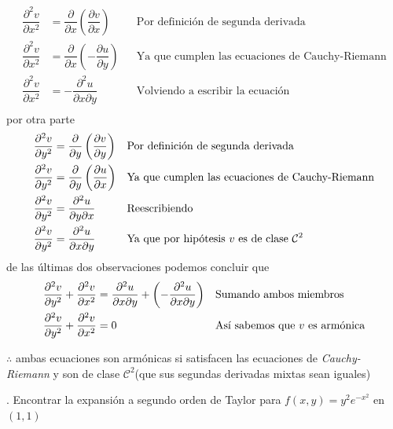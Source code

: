 \documentclass[letterpaper]{article}
\renewcommand{\d}{\partial}
\renewcommand{\*}{\cdot}
\theoremstyle{definition}
\begin{document}
\begin{align*}
\dfrac{\d^2v}{\d x^2} &= \dfrac{\d}{\d x}\left( \dfrac{\d v}{\d x} \right) &&\text{Por definición de segunda derivada}\\
\dfrac{\d^2v}{\d x^2} &= \dfrac{\d}{\d x}\left( - \dfrac{\d u}{\d y} \right) &&\text{Ya que cumplen las ecuaciones de Cauchy-Riemann}\\
\dfrac{\d^2v}{\d x^2} &= - \dfrac{\d^2 u}{\d x\d y}  &&\text{Volviendo a escribir la ecuación}\\
\end{align*}
por otra parte
\begin{align*}
\dfrac{\d^2v}{\d y^2} &= \dfrac{\d}{\d y}\left( \dfrac{\d v}{\d y} \right) &&\text{Por definición de segunda derivada}\\
\dfrac{\d^2v}{\d y^2} &= \dfrac{\d}{\d y}\left(\dfrac{\d u}{\d x} \right) &&\text{Ya que cumplen las ecuaciones de Cauchy-Riemann}\\
\dfrac{\d^2v}{\d y^2} &= \dfrac{\d^2 u}{\d y\d x}&&\text{Reescribiendo}\\
\dfrac{\d^2v}{\d y^2} &=\dfrac{\d^2 u}{\d x\d y}&&\text{Ya que por hipótesis $ v $ es de clase }\mathcal{C}^2\\
\end{align*}
de las últimas dos observaciones podemos concluir que
\begin{align*}
\dfrac{\d^2v}{\d y^2} +\dfrac{\d^2v}{\d x^2} &= \dfrac{\d^2 u}{\d x\d y} +\left( - \dfrac{\d^2 u}{\d x\d y} \right)&&\text{Sumando ambos miembros }\\
\dfrac{\d^2v}{\d y^2} +\dfrac{\d^2v}{\d x^2} &= 0  &&\text{Así sabemos que $ v $ es armónica}\\
\end{align*}
\begin{center}
	$ \therefore $ ambas ecuaciones son armónicas si satisfacen las ecuaciones de  \textit{Cauchy-Riemann} y son de clase $ \mathcal{C}^2 $(que sus segundas derivadas mixtas sean iguales)
\end{center}
. Encontrar la expansión a segundo orden de Taylor para $f(x,y) = y^2e^{-x^2}$ en $(1,1)$\\
\end{document}
